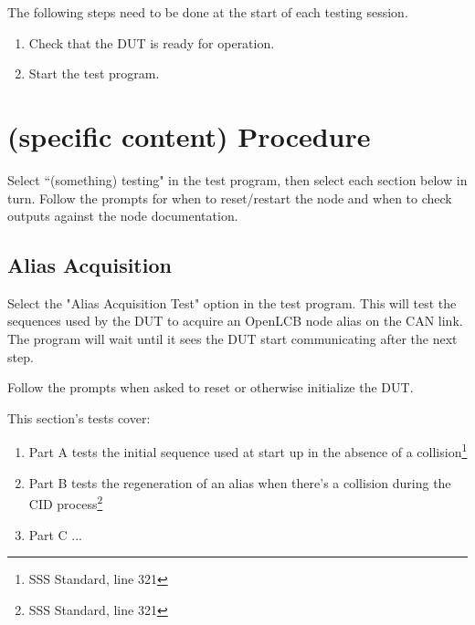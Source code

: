 \documentclass[11pt]{article}
\begin{document}
The following steps need to be done at the start of each testing session.
\begin{enumerate}
\item Check that the DUT is ready for operation.
\item Start the test program.
\end{enumerate}

\section{(specific content) Procedure}

Select ``(something) testing" in the test program, 
then select each section below in turn.  Follow the prompts
for when to reset/restart the node and when to check 
outputs against the node documentation.

\subsection{Alias Acquisition}
Select the "Alias Acquisition Test" option in the test program. 
This will test the sequences used by the DUT to acquire an OpenLCB node alias on the CAN link. 
The program will wait until it sees the DUT start communicating after the next step.

Follow the prompts when asked to reset or otherwise initialize the DUT.

This section's tests cover:

\begin{enumerate}
\item Part A tests the initial sequence used at start up in the absence of a collision\footnote{SSS Standard, line 321}
\item Part B tests the regeneration of an alias when there's a collision during the CID process\footnote{SSS Standard, line 321}
\item Part C ...
	\end{enumerate}
\end{document}
